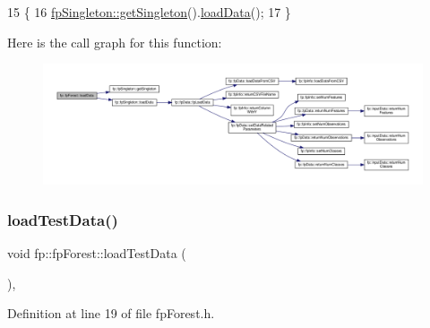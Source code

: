 \begin{DoxyCode}
15                            \{
16                 \hyperlink{classfp_1_1fpSingleton_a8bdae77b68521003e3fc630edec2e240}{fpSingleton::getSingleton}().\hyperlink{classfp_1_1fpSingleton_a86042ae6be6f59dfb90232678350011a}{loadData}();
17             \}
\end{DoxyCode}
Here is the call graph for this function\+:
\nopagebreak
\begin{figure}[H]
\begin{center}
\leavevmode
\includegraphics[width=350pt]{classfp_1_1fpForest_a01631065f4909f10cea4b690084a345a_cgraph}
\end{center}
\end{figure}
\mbox{\label{classfp_1_1fpForest_abdcf008b65b6af7be5428d838b33be32}} 
\subsubsection{\texorpdfstring{load\+Test\+Data()}{loadTestData()}}
{\footnotesize\ttfamily void fp\+::fp\+Forest\+::load\+Test\+Data (\begin{DoxyParamCaption}{ }\end{DoxyParamCaption})\hspace{0.3cm}{\ttfamily [inline]}, {\ttfamily [protected]}}



Definition at line 19 of file fp\+Forest.\+h.


